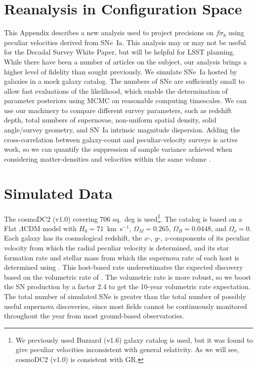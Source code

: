 \documentclass{aastex62}   	%
\begin{document}
\appendix
\section{Reanalysis in Configuration Space}

This Appendix describes a new analysis used to project precisions on $f\sigma_8$ using peculiar velocities derived from SNe~Ia.
This analysis may or may not be useful for the Decadal Survey White Paper, but will be helpful for LSST planning.
While there have been a number of articles on the subject,
our analysis brings a higher level of fidelity than sought previously.  We simulate SNe~Ia hosted by galaxies in a mock galaxy
catalog. The numbers of SNe are sufficiently small to allow fast evaluations of the likelihood, which enable the determination of parameter
posteriors using MCMC on reasonable computing timescales.   We can use our machinery to 
compare different survey parameters, such as redshift depth, total numbers of supernovae, non-uniform spatial density,
solid angle/survey geometry, and SN~Ia intrinsic magnitude dispersion.
Adding the cross-correlation between galaxy-count and peculiar-velocity surveys is active work, so we can
quantify the suppression of sample variance achieved when considering matter-densities and velocities 
within the same volume \citep{2007PhRvL..99h1301G}.

\section{Simulated Data}
The cosmoDC2 (v1.0) covering 706 sq.~deg is used\footnote{We previously used
Buzzard (v1.6) galaxy catalog is used, but it was found to give peculiar velocities inconsistent with general relativity.  As we will see,
cosmoDC2 (v1.0) is consistent with GR. }. 
The catalog is based on a Flat $\Lambda$CDM model with $H_0=71$~km~s$^{-1}$,  $\Omega_M=0.265$, $\Omega_B=0.0448$, and
$\Omega_\nu=0$.
Each galaxy has its cosmological redshift, the $x$-, $y$-, $z$-components of its peculiar velocity from which
the radial peculiar velocity is determined, and its
star formation rate and stellar mass from which the
supernova rate of each host is determined using 
\citet{2012ApJ...755...61S}.   This host-based rate
underestimates the expected discovery based on the volumetric
rate of \citet{2010ApJ...713.1026D}.  The volumetric rate is more robust, so  we boost the SN production
by a factor 2.4 to get the 10-year volumetric rate expectation. The total number of simulated SNe 
is greater than the total number of possibly useful supernova discoveries, since most fields cannot be continuously monitored throughout the year
from most ground-based observatories.
\end{document}
